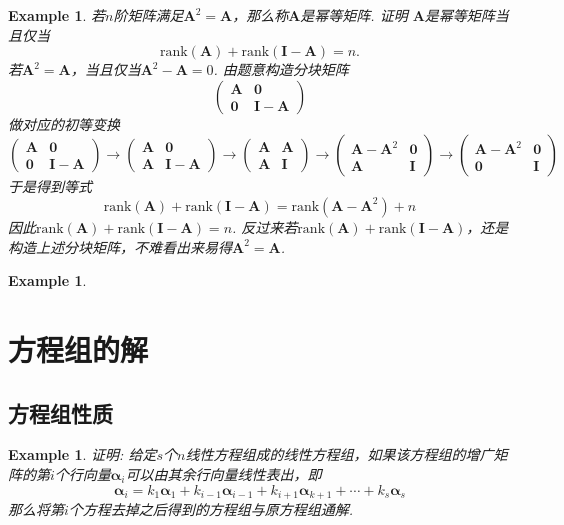 \documentclass{article}
\newtheorem{example}[theorem]{Example}
\newcommand{\mbf}[1]{\bm{#1}}
\newcommand{\rank}[1]{\text{rank}\left(#1\right)} %
\begin{document}
\begin{example}
\rm 若$n$阶矩阵满足$\mbf{A}^2 = \mbf{A}$，那么称$\mbf{A}$是幂等矩阵. 证明
$\mbf{A}$是幂等矩阵当且仅当
$$
\rank{\mbf{A}} + \rank{\mbf{I}-\mbf{A}} = n.
$$
\rm 若$\mbf{A}^2 = \mbf{A}$，当且仅当$\mbf{A}^2 - \mbf{A} = 0$. 由题意构造分块矩阵
$$
\begin{pmatrix}
\mbf{A} & \mbf{0} \\
\mbf{0} & \mbf{I}-\mbf{A}
\end{pmatrix}
$$
做对应的初等变换
$$
\begin{pmatrix}
\mbf{A} & \mbf{0} \\
\mbf{0} & \mbf{I}-\mbf{A}
\end{pmatrix} \longrightarrow 
\begin{pmatrix}
\mbf{A} & \mbf{0} \\
\mbf{A} & \mbf{I}-\mbf{A}
\end{pmatrix} \longrightarrow
\begin{pmatrix}
\mbf{A} & \mbf{A} \\
\mbf{A} & \mbf{I} 
\end{pmatrix} \longrightarrow
\begin{pmatrix}
\mbf{A}-\mbf{A}^2 & \mbf{0} \\
\mbf{A} & \mbf{I} 
\end{pmatrix} \longrightarrow
\begin{pmatrix}
\mbf{A}-\mbf{A}^2 & \mbf{0} \\
\mbf{0} & \mbf{I} 
\end{pmatrix}
$$
于是得到等式
$$
\rank{\mbf{A}} + \rank{\mbf{I}-\mbf{A}} = \rank{\mbf{A}-\mbf{A}^2} + n
$$ 
因此$\rank{\mbf{A}} + \rank{\mbf{I}-\mbf{A}} = n$. 反过来若$\rank{\mbf{A}} + \rank{\mbf{I}-\mbf{A}}$，还是构造上述分块矩阵，不难看出来易得$\mbf{A}^2 = \mbf{A}$. 


\end{example}

\begin{example}
\rm 
\end{example}

\newpage
\section{方程组的解}

\subsection{方程组性质}

\begin{example}
\rm 证明: 给定$s$个$n$线性方程组成的线性方程组，如果该方程组的增广矩阵的第$i$个行向量$\mbf{\alpha}_i$可以由其余行向量线性表出，即
$$
\mbf{\alpha}_i = k_1\mbf{\alpha}_1 + k_{i-1}\mbf{\alpha}_{i-1} + k_{i+1}\mbf{\alpha}_{k+1} + \cdots + k_s\mbf{\alpha}_s 
$$
那么将第$i$个方程去掉之后得到的方程组与原方程组通解. 
\end{example}
\end{document}
